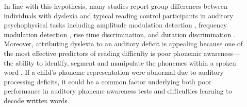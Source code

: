 \documentclass[../uwthesis.tex]{subfiles}
\begin{document}
In line with this hypothesis, many studies report group differences between individuals with dyslexia and typical reading control participants in auditory psychophysical tasks including amplitude modulation detection \cite{Hamalainen2013BasicDyslexia, McAnally1997ScalpDyslexia.,Menell1999PsychophysicalListeners,Rocheron2002TemporalChildren,Witton1998SensitivityReaders}, frequency modulation detection \cite{Boets2007AuditoryTheory,Dawes2009TemporalDyslexia,Gibson2006VisualDyslexia,Stoodley2006AuditoryNormal,Witton2002SeparateReaders.}, rise time discrimination, and duration discrimination \cite{Banai2004PoorMemory,Banai2006AuditoryRelated,Goswami2011RiseDyslexia,Thomson2006AuditoryDyslexia,Thomson2008RhythmicSpelling}. Moreover, attributing dyslexia to an auditory deficit is appealing because one of the most effective predictors of reading difficulty is poor phonemic awareness---the ability to identify, segment and manipulate the phonemes within a spoken word \cite{Bus1999PhonologicalStudies.,Hulme2002PhonemeAwareness}. If a child's phoneme representation were abnormal due to auditory processing deficits, it could be a common factor underlying both poor performance in auditory phoneme awareness tests and difficulties learning to decode written words.
\end{document}
